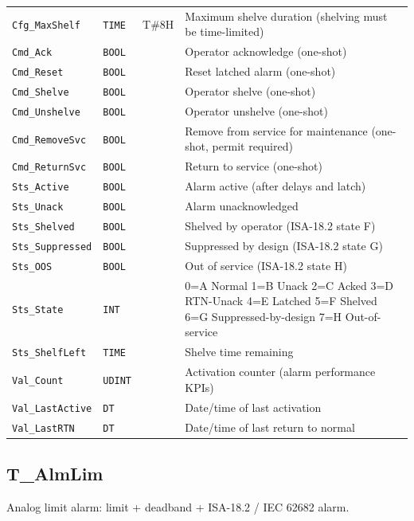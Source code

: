 \begin{small}
\begin{longtable}{@{}P{3.70cm}P{2.20cm}P{1.70cm}P{8.91cm}@{}}
\texttt{Cfg\_MaxShelf} & \texttt{TIME} & T\#8H & Maximum shelve duration (shelving must be time-limited) \\
\texttt{Cmd\_Ack} & \texttt{BOOL} &  & Operator acknowledge (one-shot) \\
\texttt{Cmd\_Reset} & \texttt{BOOL} &  & Reset latched alarm (one-shot) \\
\texttt{Cmd\_Shelve} & \texttt{BOOL} &  & Operator shelve (one-shot) \\
\texttt{Cmd\_Unshelve} & \texttt{BOOL} &  & Operator unshelve (one-shot) \\
\texttt{Cmd\_RemoveSvc} & \texttt{BOOL} &  & Remove from service for maintenance (one-shot, permit required) \\
\texttt{Cmd\_ReturnSvc} & \texttt{BOOL} &  & Return to service (one-shot) \\
\texttt{Sts\_Active} & \texttt{BOOL} &  & Alarm active (after delays and latch) \\
\texttt{Sts\_Unack} & \texttt{BOOL} &  & Alarm unacknowledged \\
\texttt{Sts\_Shelved} & \texttt{BOOL} &  & Shelved by operator (ISA-18.2 state F) \\
\texttt{Sts\_Suppressed} & \texttt{BOOL} &  & Suppressed by design (ISA-18.2 state G) \\
\texttt{Sts\_OOS} & \texttt{BOOL} &  & Out of service (ISA-18.2 state H) \\
\texttt{Sts\_State} & \texttt{INT} &  & 0=A Normal 1=B Unack 2=C Acked 3=D RTN-Unack 4=E Latched 5=F Shelved 6=G Suppressed-by-design 7=H Out-of-service \\
\texttt{Sts\_ShelfLeft} & \texttt{TIME} &  & Shelve time remaining \\
\texttt{Val\_Count} & \texttt{UDINT} &  & Activation counter (alarm performance KPIs) \\
\texttt{Val\_LastActive} & \texttt{DT} &  & Date/\allowbreak{}time of last activation \\
\texttt{Val\_LastRTN} & \texttt{DT} &  & Date/\allowbreak{}time of last return to normal \\
\bottomrule
\end{longtable}
\end{small}

\subsection{T\_AlmLim}\label{sec:pclib-t-almlim}

Analog limit alarm: limit + deadband + ISA-18.2 /\allowbreak{} IEC 62682 alarm.

